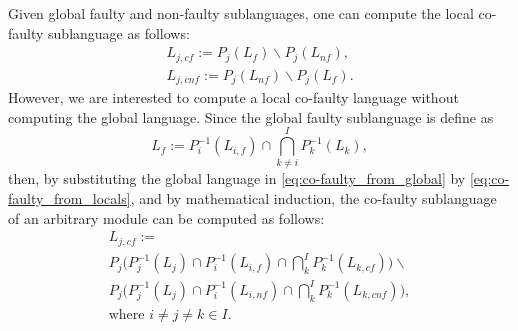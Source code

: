 \documentclass[a4paper, 10pt, conference]{ieeeconf}
\begin{document}

Given global faulty and non-faulty sublanguages, one can compute the local
co-faulty sublanguage as follows:
\begin{equation}
\label{eq:co-faulty_from_global}
	\begin{array}{l}
		L_{j,cf} := P_j(L_f) \backslash P_j(L_{nf}),\\ 
		L_{j,cnf} := P_j(L_{nf}) \backslash P_j(L_{f}).	
	\end{array}
\end{equation}
However, we are interested to compute a local co-faulty
language without computing the global language. Since the global
faulty sublanguage is define as
\begin{equation}
\label{eq:co-faulty_from_locals}
	L_f := P_i^{-1}(L_{i,f}) \cap \bigcap_{k\neq
	i}^I P_k^{-1}(L_k),
\end{equation}
then, by substituting the global language in \ref{eq:co-faulty_from_global} by
\ref{eq:co-faulty_from_locals}, and by mathematical induction, the co-faulty
sublanguage of an arbitrary module can be computed as follows:
\begin{equation}
\label{eq:co-faulty_iterative_w_faulty}
	\begin{array}{l}
		L_{j,cf} := 
		\\
		P_j\Big(P_j^{-1}(L_j) \cap P_i^{-1}(L_{i,f})\cap 
		\bigcap_k^I P_k^{-1}(L_{k,cf})\Big) \backslash 
		\\
		P_j\Big(P_j^{-1}(L_j) \cap P_i^{-1}(L_{i,nf})\cap 
		\bigcap_k^I P_k^{-1}(L_{k,cnf})\Big),
		\\ 
		\textrm{where } i\neq j\neq k \in I.
	\end{array}
\end{equation}
\end{document}
